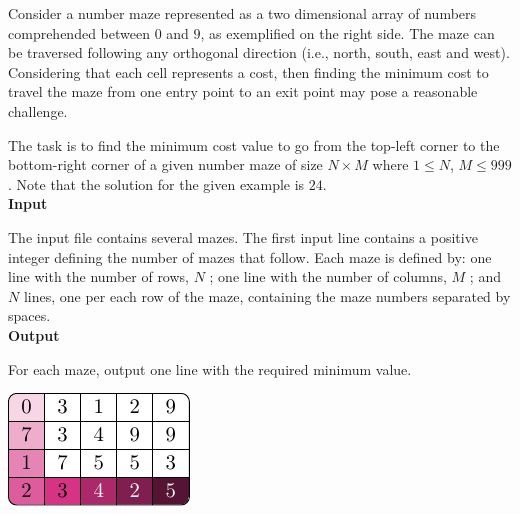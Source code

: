 \documentclass[a4paper,10pt]{article}
\begin{document}

\begin{tcolorbox}[enhanced, frame hidden, borderline west = {1.5pt}{0pt}{gray-700},sidebyside,
    sidebyside align=center,lefthand width=10cm,lower separated=false,fontupper=\sffamily]
    \noindent Consider a number maze represented as a two dimensional array of 
    numbers comprehended between $0$ and $9$, as exemplified on the right side. The 
    maze can be traversed following any orthogonal direction (i.e., north, 
    south, east and west). Considering that each cell represents a cost, then 
    finding the minimum cost to travel the maze from one entry point to 
    an exit point may pose a reasonable challenge.
    
    \noindent The task is to find the minimum cost value to go from the top-left 
    corner to the bottom-right corner of a given number maze of size $N \times M$ 
    where $1 \leq N$, $M \leq 999$. Note that the solution for the given example is $24$. \vspace{1mm} \\
    
    \noindent\textbf{Input}\vspace{1mm}
    
    \noindent The input file contains several mazes. The first input line contains a positive integer defining the number 
    of mazes that follow. Each maze is defined by: one line with the number of rows, $N$ ; one line with 
    the number of columns, $M$ ; and $N$ lines, one per each row of the maze, containing the maze numbers 
    separated by spaces.\vspace{1mm} \\
    
    \noindent\textbf{Output}\vspace{1mm}
    
    \noindent For each maze, output one line with the required minimum value.
    
    \tcblower
        \centering
        \includegraphics[scale=1.2]{maze_exp.pdf}
            \label{fig:mazeexp}
\end{tcolorbox}
\end{document}
